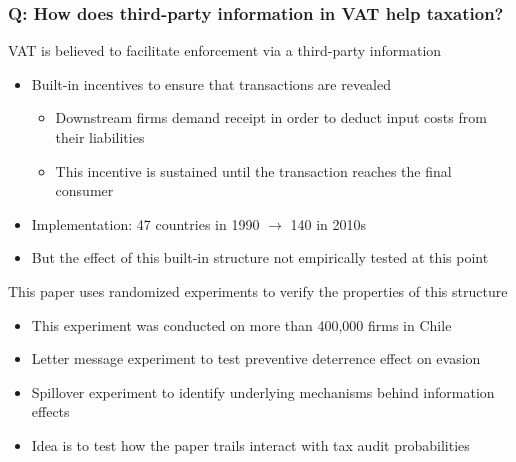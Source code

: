 \documentclass[aspectratio=169]{beamer}
\begin{document}
\begin{frame}
\frametitle{Q: How does third-party information in VAT help taxation?} 
VAT is believed to facilitate enforcement via a third-party information 
\begin{itemize}\setlength\itemsep{3pt}
\item Built-in incentives to ensure that transactions are revealed
\begin{itemize}\setlength\itemsep{3pt}
  \item Downstream firms demand receipt in order to deduct input costs from their liabilities
  \item This incentive is sustained until the transaction reaches the final consumer
\end{itemize}
\item Implementation: 47 countries in 1990 $\to$ 140 in 2010s 
\item But the effect of this built-in structure not empirically tested at this point
\end{itemize}\medskip
This paper uses randomized experiments to verify the properties of this structure
\begin{itemize}\setlength\itemsep{3pt}
  \item This experiment was conducted on more than 400,000 firms in Chile
  \item Letter message experiment to test preventive deterrence effect on evasion
  \item Spillover experiment to identify underlying mechanisms behind information effects
  \item Idea is to test how the paper trails interact with tax audit probabilities
\end{itemize}
\end{frame}
\end{document}
